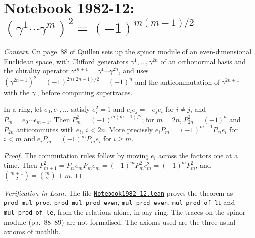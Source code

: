 \section[Notebook 1982-12: $(\gamma^1\texorpdfstring{\cdots}{...}\gamma^m)^2$]{Notebook 1982-12: $(\gamma^1\cdots\gamma^m)^2 = (-1)^{m(m-1)/2}$\protect{}}\label{sec:quillen-1982-12}

\emph{Context.} On page~88 of  Quillen sets up the spinor module of an even-dimensional Euclidean space, with Clifford generators $\gamma^1, \ldots, \gamma^{2n}$ of an orthonormal basis and the chirality operator $\gamma^{2n+1} = \gamma^1\cdots\gamma^{2n}$, and uses $(\gamma^{2n+1})^2 = (-1)^{2n(2n-1)/2} = (-1)^n$ and the anticommutation of $\gamma^{2n+1}$ with the $\gamma^i$, before computing supertraces.

\begin{encadre}
\begin{theoreme}\label{thm:quillen-1982-12}
In a ring, let $e_0, e_1, \ldots$ satisfy $e_i^2 = 1$ and $e_ie_j = -e_je_i$ for $i \ne j$, and $P_m = e_0\cdots e_{m-1}$. Then $P_m^2 = (-1)^{m(m-1)/2}$; for $m = 2n$, $P_{2n}^2 = (-1)^n$ and $P_{2n}$ anticommutes with $e_i$, $i < 2n$. More precisely $e_iP_m = (-1)^{m-1}P_me_i$ for $i < m$ and $e_iP_m = (-1)^mP_me_i$ for $i \ge m$.
\end{theoreme}
\end{encadre}

\begin{proof}
The commutation rules follow by moving $e_i$ across the factors one at a time. Then $P_{m+1}^2 = P_me_mP_me_m = (-1)^mP_m^2e_m^2 = (-1)^mP_m^2$, and $\binom{m+1}{2} = \binom m2 + m$.
\end{proof}

\emph{Verification in Lean.} The file \href{\leanblobmain/Notebook1982_12.lean}{\texttt{Notebook1982\_12.\allowbreak{}lean}} proves the theorem as \texttt{prod\_mul\_prod}, \texttt{prod\_mul\_prod\_even}, \texttt{mul\_prod\_even}, \texttt{mul\_prod\_of\_lt} and \texttt{mul\_prod\_of\_le}, from the relations alone, in any ring. The traces on the spinor module (pp.~88--89) are not formalised. The axioms used are the three usual axioms of mathlib.

